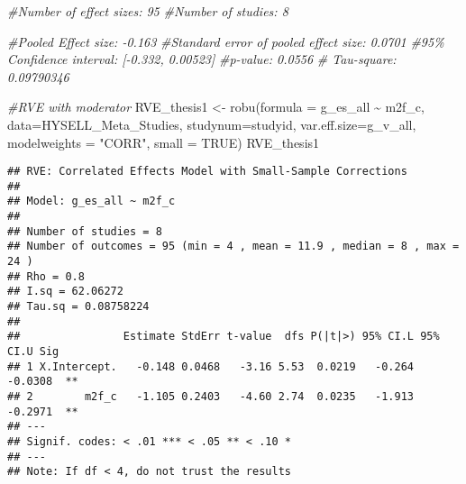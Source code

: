 \documentclass[
]{book}
\newenvironment{Shaded}{\begin{snugshade}}{\end{snugshade}}
\newcommand{\AttributeTok}[1]{\textcolor[rgb]{0.77,0.63,0.00}{#1}}
\newcommand{\CommentTok}[1]{\textcolor[rgb]{0.56,0.35,0.01}{\textit{#1}}}
\newcommand{\ConstantTok}[1]{\textcolor[rgb]{0.00,0.00,0.00}{#1}}
\newcommand{\FunctionTok}[1]{\textcolor[rgb]{0.00,0.00,0.00}{#1}}
\newcommand{\NormalTok}[1]{#1}
\newcommand{\OtherTok}[1]{\textcolor[rgb]{0.56,0.35,0.01}{#1}}
\newcommand{\SpecialCharTok}[1]{\textcolor[rgb]{0.00,0.00,0.00}{#1}}
\newcommand{\StringTok}[1]{\textcolor[rgb]{0.31,0.60,0.02}{#1}}
\begin{document}
\begin{Shaded}
\begin{Highlighting}[]
\CommentTok{\#Number of effect sizes: 95}
\CommentTok{\#Number of studies: 8}

\CommentTok{\#Pooled Effect size: {-}0.163}
\CommentTok{\#Standard error of pooled effect size: 0.0701}
\CommentTok{\#95\% Confidence interval: [{-}0.332, 0.00523]}
\CommentTok{\#p{-}value: 0.0556}
\CommentTok{\# Tau{-}square: 0.09790346 }


\CommentTok{\#RVE with moderator}
\NormalTok{RVE\_thesis1 }\OtherTok{\textless{}{-}} \FunctionTok{robu}\NormalTok{(}\AttributeTok{formula =}\NormalTok{ g\_es\_all }\SpecialCharTok{\textasciitilde{}}\NormalTok{ m2f\_c, }\AttributeTok{data=}\NormalTok{HYSELL\_Meta\_Studies, }\AttributeTok{studynum=}\NormalTok{studyid, }\AttributeTok{var.eff.size=}\NormalTok{g\_v\_all, }
                    \AttributeTok{modelweights =} \StringTok{"CORR"}\NormalTok{, }\AttributeTok{small =} \ConstantTok{TRUE}\NormalTok{)}
\NormalTok{RVE\_thesis1}
\end{Highlighting}
\end{Shaded}

\begin{verbatim}
## RVE: Correlated Effects Model with Small-Sample Corrections 
## 
## Model: g_es_all ~ m2f_c 
## 
## Number of studies = 8 
## Number of outcomes = 95 (min = 4 , mean = 11.9 , median = 8 , max = 24 )
## Rho = 0.8 
## I.sq = 62.06272 
## Tau.sq = 0.08758224 
## 
##                Estimate StdErr t-value  dfs P(|t|>) 95% CI.L 95% CI.U Sig
## 1 X.Intercept.   -0.148 0.0468   -3.16 5.53  0.0219   -0.264  -0.0308  **
## 2        m2f_c   -1.105 0.2403   -4.60 2.74  0.0235   -1.913  -0.2971  **
## ---
## Signif. codes: < .01 *** < .05 ** < .10 *
## ---
## Note: If df < 4, do not trust the results
\end{verbatim}
\end{document}
